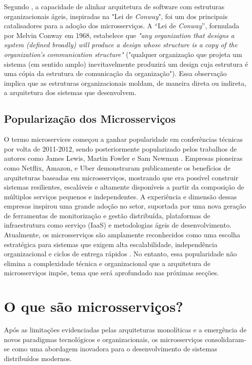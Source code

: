 Segundo \cite{Lewis2014}, a capacidade de alinhar arquitetura de software com estruturas organizacionais ágeis, inspiradas na "Lei de \textit{ Conway}", foi um dos principais catalisadores para a adoção dos microsserviços. A “Lei de \textit{ Conway}”, formulada por Melvin Conway em 1968, estabelece que \textit{ "any organization that designs a system (defined broadly) will produce a design whose structure is a copy of the organization's communication structure"} \cite{Bailey2013} ("qualquer organização que projeta um sistema (em sentido amplo) inevitavelmente produzirá um design cuja estrutura é uma cópia da estrutura de comunicação da organização"). Essa observação implica que as estruturas organizacionais moldam, de maneira direta ou indireta, a arquitetura dos sistemas que desenvolvem.



\subsection{Popularização dos Microsserviços}

O termo microservices começou a ganhar popularidade em conferências técnicas por volta de 2011-2012, sendo posteriormente popularizado pelos trabalhos de autores como James Lewis, Martin Fowler e Sam Newman \cite{Lewis2014,Newman2015}. Empresas pioneiras como Netflix, Amazon, e Uber demonstraram publicamente os benefícios de arquiteturas baseadas em microsserviços, mostrando que era possível construir sistemas resilientes, escaláveis e altamente disponíveis a partir da composição de múltiplos serviços pequenos e independentes.
A experiência e dimensão dessas empresas inspirou uma grande adoção no setor, suportada por uma nova geração de ferramentas de monitorização e gestão distribuída, plataformas de infraestrutura como serviço (IaaS) e metodologias ágeis de desenvolvimento.
Atualmente, os microsserviços são amplamente reconhecidos como uma escolha estratégica para sistemas que exigem alta escalabilidade, independência organizacional e ciclos de entrega rápidos 
\cite{Dragoni2017}. No entanto, essa popularidade não elimina a complexidade técnica e organizacional que a arquitetura de microsserviços impõe, tema que será aprofundado nas próximas secções.


\section{O que são microsserviços?}

Após as limitações evidenciadas pelas arquiteturas monolíticas e a emergência de novos paradigmas tecnológicos e organizacionais, os microsserviços consolidaram-se como uma abordagem inovadora para o desenvolvimento de sistemas distribuídos modernos.

